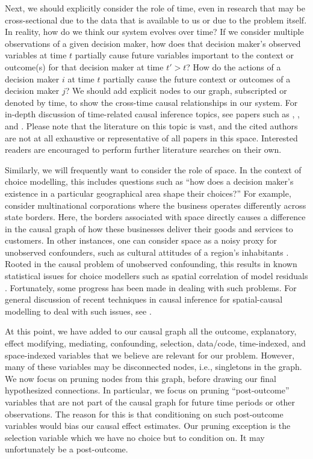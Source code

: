 Next, we should explicitly consider the role of time, even in research that may be cross-sectional due to the data that is available to us or due to the problem itself.
In reality, how do we think our system evolves over time?
If we consider multiple observations of a given decision maker, how does that decision maker's observed variables at time $t$ partially cause future variables important to the context or outcome(s) for that decision maker at time $t' > t$?
How do the actions of a decision maker $i$ at time $t$ partially cause the future context or outcomes of a decision maker $j$?
We should add explicit nodes to our graph, subscripted or denoted by time, to show the cross-time causal relationships in our system.
For in-depth discussion of time-related causal inference topics, see papers such as \citet{gill_2001_causal}, \citet{eichler_2007_granger}, and \citet{peters_2013_causal}.
Please note that the literature on this topic is vast, and the cited authors are not at all exhaustive or representative of all papers in this space.
Interested readers are encouraged to perform further literature searches on their own.

Similarly, we will frequently want to consider the role of space.
In the context of choice modelling, this includes questions such as ``how does a decision maker's existence in a particular geographical area shape their choices?''
For example, consider multinational corporations where the business operates differently across state borders.
Here, the borders associated with space directly causes a difference in the causal graph of how these businesses deliver their goods and services to customers.
In other instances, one can consider space as a noisy proxy for unobserved confounders, such as cultural attitudes of a region's inhabitants \citep{paciorek_2010_importance}.
Rooted in the causal problem of unobserved confounding, this results in known statistical issues for choice modellers such as spatial correlation of model residuals \citep{fleming_2004_techniques}.
Fortunately, some progress has been made in dealing with such problems.
For general discussion of recent techniques in causal inference for spatial-causal modelling to deal with such issues, see \citet{osama_2019_inferring}.

At this point, we have added to our causal graph all the
outcome, explanatory, effect modifying, mediating, confounding, selection, data/code, time-indexed, and space-indexed variables that we believe are relevant for our problem.
However, many of these variables may be disconnected nodes, i.e., singletons in the graph.
We now focus on pruning nodes from this graph, before drawing our final hypothesized connections.
In particular, we focus on pruning ``post-outcome'' variables that are not part of the causal graph for future time periods or other observations.
The reason for this is that conditioning on such post-outcome variables would bias our causal effect estimates.
Our pruning exception is the selection variable which we have no choice but to condition on.
It may unfortunately be a post-outcome.


